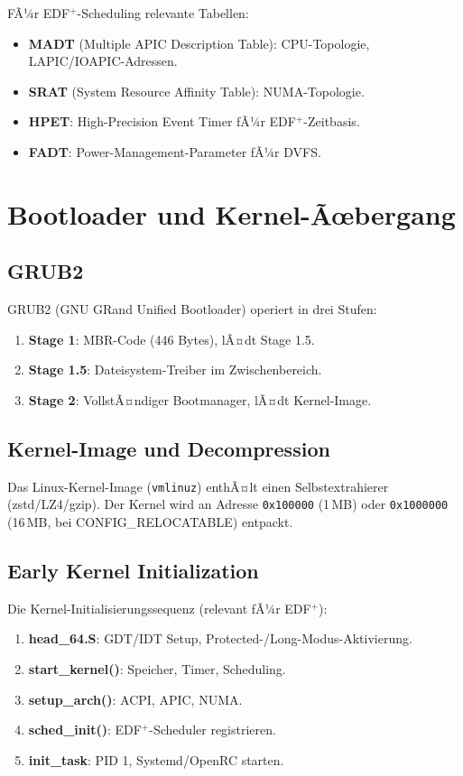 ﻿\documentclass[a4paper,12pt]{scrreprt}
\theoremstyle{definition}
\begin{document}
	FÃ¼r EDF$^+$-Scheduling relevante Tabellen:
	\begin{itemize}
		\item \textbf{MADT} (Multiple APIC Description Table): CPU-Topologie,
		LAPIC/IOAPIC-Adressen.
		\item \textbf{SRAT} (System Resource Affinity Table): NUMA-Topologie.
		\item \textbf{HPET}: High-Precision Event Timer fÃ¼r EDF$^+$-Zeitbasis.
		\item \textbf{FADT}: Power-Management-Parameter fÃ¼r DVFS.
	\end{itemize}
	
	\section{Bootloader und Kernel-Ãœbergang}
	
	\subsection{GRUB2}
	
	GRUB2 (GNU GRand Unified Bootloader) operiert in drei Stufen:
	\begin{enumerate}
		\item \textbf{Stage 1}: MBR-Code (446 Bytes), lÃ¤dt Stage 1.5.
		\item \textbf{Stage 1.5}: Dateisystem-Treiber im Zwischenbereich.
		\item \textbf{Stage 2}: VollstÃ¤ndiger Bootmanager, lÃ¤dt Kernel-Image.
	\end{enumerate}
	
	\subsection{Kernel-Image und Decompression}
	
	Das Linux-Kernel-Image (\texttt{vmlinuz}) enthÃ¤lt einen Selbstextrahierer
	(zstd/LZ4/gzip). Der Kernel wird an Adresse \texttt{0x100000} (1\,MB) oder
	\texttt{0x1000000} (16\,MB, bei CONFIG\_RELOCA\newline TABLE) entpackt.
	
	\subsection{Early Kernel Initialization}
	
	Die Kernel-Initialisierungssequenz (relevant fÃ¼r EDF$^+$):
	\begin{enumerate}
		\item \textbf{head\_64.S}: GDT/IDT Setup, Protected-/Long-Modus-Aktivierung.
		\item \textbf{start\_kernel()}: Speicher, Timer, Scheduling.
		\item \textbf{setup\_arch()}: ACPI, APIC, NUMA.
		\item \textbf{sched\_init()}: EDF$^+$-Scheduler registrieren.
		\item \textbf{init\_task}: PID 1, Systemd/OpenRC starten.
	\end{enumerate}
	
\end{document}
